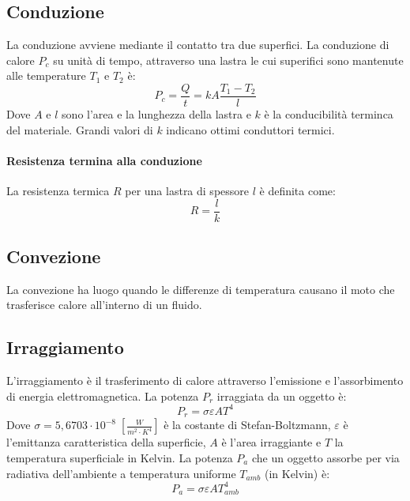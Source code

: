            \subsection{Conduzione} La conduzione avviene mediante il contatto
            tra due superfici. La conduzione di calore $P_c$ su unità di tempo,
            attraverso una lastra le cui superifici sono mantenute alle 
            temperature $T_1$ e $T_2$ è:
                \begin{equation}
                    P_c = \frac{Q}{t} = kA\frac{T_1 - T_2}{l}
                \end{equation}
            Dove $A$ e $l$ sono l'area e la lunghezza della lastra e $k$ è la 
            conducibilità terminca del materiale. Grandi valori di $k$ indicano
            ottimi conduttori termici.

            \paragraph{Resistenza termina alla conduzione} La resistenza 
            termica $R$ per una lastra di spessore $l$ è definita come:
                \begin{equation}
                    R = \frac{l}{k}
                \end{equation}

            \subsection{Convezione} La convezione ha luogo quando le differenze
            di temperatura causano il moto che trasferisce calore all'interno 
            di un fluido.

            \subsection{Irraggiamento} L'irraggiamento è il trasferimento di 
            calore attraverso l'emissione e l'assorbimento di energia 
            elettromagnetica. La potenza $P_r$ irraggiata da un oggetto è:
                \begin{equation}
                    P_r = \sigma \varepsilon AT^4
                \end{equation}
            Dove $\sigma = 5,6703 \cdot 10^{-8} \; [\frac{W}{m^2 \cdot K^4}
            ]$ è la costante di Stefan-Boltzmann, $\varepsilon$ è l'emittanza
            caratteristica della superficie, $A$ è l'area irraggiante e $T$ la 
            temperatura superficiale in Kelvin. La potenza $P_a$ che un oggetto
            assorbe per via radiativa dell'ambiente a temperatura uniforme
            $T_{amb}$ (in Kelvin) è:
                \begin{equation}
                    P_a = \sigma \varepsilon AT^4_{amb}
                \end{equation}

